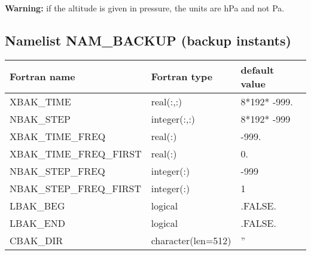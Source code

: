 \textbf{Warning:} if the altitude is given in pressure, the units are hPa and not Pa.

\subsection{Namelist NAM\_BACKUP (backup instants)}\label{s:nambackup}

\begin{center}
\begin{tabular} {|l|l|l|}
\hline
Fortran name & Fortran type & default value \\
\hline
XBAK\_TIME              & real(:,:)          & 8*192* -999. \\
NBAK\_STEP              & integer(:,:)       & 8*192* -999  \\
XBAK\_TIME\_FREQ        & real(:)            & -999.        \\
XBAK\_TIME\_FREQ\_FIRST & real(:)            & 0.           \\
NBAK\_STEP\_FREQ        & integer(:)         & -999         \\
NBAK\_STEP\_FREQ\_FIRST & integer(:)         & 1            \\
LBAK\_BEG               & logical            & .FALSE.      \\
LBAK\_END               & logical            & .FALSE.      \\
CBAK\_DIR               & character(len=512) & ''           \\
\hline
\end{tabular}
\end{center}

